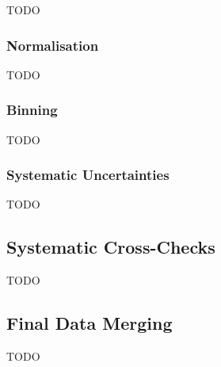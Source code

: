 TODO


\subsubsection{Normalisation}
\label{sec:normalisation}

TODO


\subsubsection{Binning}
\label{sec:binning}

TODO


\subsubsection{Systematic Uncertainties}
\label{sec:systematics}

TODO


\subsection{Systematic Cross-Checks}
\label{sec:cross checks}

TODO


\subsection{Final Data Merging}
\label{sec:final data merging}

TODO
